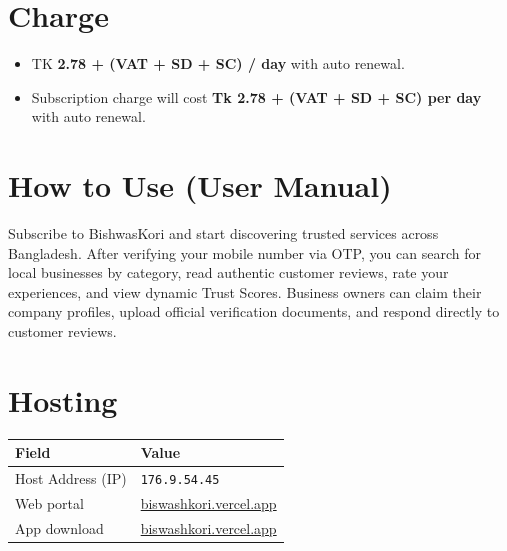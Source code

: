 \documentclass[11pt,a4paper]{article}
\begin{document}
\section*{Charge}

\begin{itemize}[leftmargin=1.4em,itemsep=2pt]
  \item TK \textbf{2.78 + (VAT + SD + SC) / day} with auto renewal.
  \item Subscription charge will cost \textbf{Tk 2.78 + (VAT + SD + SC) per
        day} with auto renewal.
\end{itemize}

\section*{How to Use (User Manual)}

Subscribe to BishwasKori and start discovering trusted services across Bangladesh. After verifying your mobile number via OTP, you can search for local businesses by category, read authentic customer reviews, rate your experiences, and view dynamic Trust Scores. Business owners can claim their company profiles, upload official verification documents, and respond directly to customer reviews.

\section*{Hosting}

\begin{tabularx}{\textwidth}{@{}lX@{}}
\toprule
\textbf{Field} & \textbf{Value} \\
\midrule
Host Address (IP) & \texttt{176.9.54.45} \\
Web portal        & \href{https://biswashkori.vercel.app/}{biswashkori.vercel.app} \\
App download      & \href{https://biswashkori.vercel.app/}{biswashkori.vercel.app} \\
\bottomrule
\end{tabularx}
\end{document}
